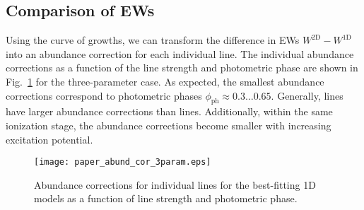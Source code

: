 \documentclass{aa}
\begin{document}
\subsection{Comparison of EWs}
Using the curve of growths, we can transform the difference in EWs  $W^\mathrm{2D}-W^\mathrm{1D}$ into an abundance correction for each 
individual line. The individual abundance corrections 
as a function  of the line strength and photometric phase 
are shown in Fig.~\ref{grav_exper_ew} for the 
three-parameter case. 
As expected, the smallest abundance 
corrections correspond to photometric phases 
$\phi_\mathrm{ph}\approx 0.3 \ldots 0.65$. 
Generally,  lines have  larger abundance 
corrections than  lines. 
Additionally,  within the same ionization stage, 
the abundance corrections become smaller 
with increasing excitation potential. 
%   
\begin{figure}
\texttt{[image: paper\_abund\_cor\_3param.eps]}
\caption{Abundance corrections for individual lines for the best-fitting 1D models as a
  function of line strength and photometric phase.}
\label{grav_exper_ew}
\end{figure} 

   
   
\end{document}

